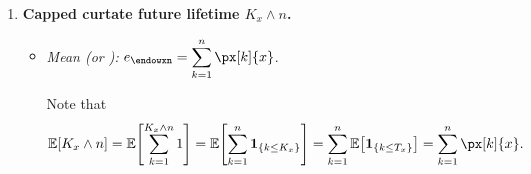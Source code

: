 \begin{enumerate}
\begin{itemize}
\end{itemize}

\item \label{it:capped-kx-mean} \textbf{Capped curtate future lifetime
\(K_x\wedge n\).}
\begin{itemize}
\item \emph{Mean (or ):}
\(\displaystyle e_{\endowxn}=\sum_{k=1}^{n}\px[k]{x}\).

\begin{pf}
Note that
\[
\expv{K_x\wedge n}=\expv{\sum_{k=1}^{K_x \wedge n}1}=\expv{\sum_{k=1}^{n}\indicset{k\le K_x}}
=\sum_{k=1}^{n}\expv{\indicset{k\le T_x}}
=\sum_{k=1}^{n}\px[k]{x}.
\]
\end{pf}
\end{itemize}
\end{enumerate}
